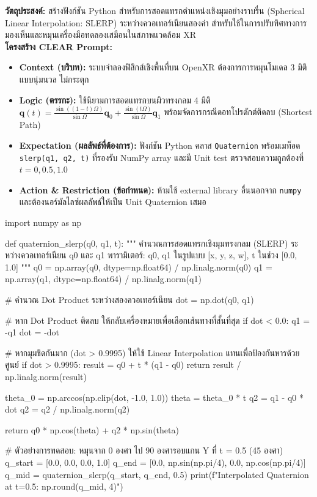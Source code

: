 \begin{aipromptbox}
\textbf{วัตถุประสงค์:} สร้างฟังก์ชัน Python สำหรับการสอดแทรกตำแหน่งเชิงมุมอย่างราบรื่น (Spherical Linear Interpolation: SLERP) ระหว่างควอเทอร์เนียนสองค่า สำหรับใช้ในการปรับทิศทางการมองเห็นและหมุนเครื่องมือทดลองเสมือนในสภาพแวดล้อม XR\\
\textbf{โครงสร้าง CLEAR Prompt:}
\begin{itemize}[topsep=1pt, itemsep=1pt, leftmargin=1.2em]
    \item \textbf{Context (บริบท):} ระบบจำลองฟิสิกส์เชิงพื้นที่บน OpenXR ต้องการการหมุนโมเดล 3 มิติแบบนุ่มนวล ไม่กระตุก
    \item \textbf{Logic (ตรรกะ):} ใช้นิยามการสอดแทรกบนผิวทรงกลม 4 มิติ $\mathbf{q}(t) = \frac{\sin((1-t)\Omega)}{\sin\Omega}\mathbf{q}_0 + \frac{\sin(t\Omega)}{\sin\Omega}\mathbf{q}_1$ พร้อมจัดการกรณีดอทโปรดักต์ติดลบ (Shortest Path)
    \item \textbf{Expectation (ผลลัพธ์ที่ต้องการ):} ฟังก์ชัน Python คลาส \texttt{Quaternion} พร้อมเมท็อด \texttt{slerp(q1, q2, t)} ที่รองรับ NumPy array และมี Unit test ตรวจสอบความถูกต้องที่ $t=0, 0.5, 1.0$
    \item \textbf{Action \& Restriction (ข้อกำหนด):} ห้ามใช้ external library อื่นนอกจาก \texttt{numpy} และต้องนอร์มัลไลซ์ผลลัพธ์ให้เป็น Unit Quaternion เสมอ
\end{itemize}
\end{aipromptbox}

\begin{codebox}
import numpy as np

def quaternion_slerp(q0, q1, t):
    """
    คำนวณการสอดแทรกเชิงมุมทรงกลม (SLERP) ระหว่างควอเทอร์เนียน q0 และ q1
    พารามิเตอร์: q0, q1 ในรูปแบบ [x, y, z, w], t ในช่วง [0.0, 1.0]
    """
    q0 = np.array(q0, dtype=np.float64) / np.linalg.norm(q0)
    q1 = np.array(q1, dtype=np.float64) / np.linalg.norm(q1)
    
    # คำนวณ Dot Product ระหว่างสองควอเทอร์เนียน
    dot = np.dot(q0, q1)
    
    # หาก Dot Product ติดลบ ให้กลับเครื่องหมายเพื่อเลือกเส้นทางที่สั้นที่สุด
    if dot < 0.0:
        q1 = -q1
        dot = -dot
        
    # หากมุมชิดกันมาก (dot > 0.9995) ให้ใช้ Linear Interpolation แทนเพื่อป้องกันหารด้วยศูนย์
    if dot > 0.9995:
        result = q0 + t * (q1 - q0)
        return result / np.linalg.norm(result)
        
    theta_0 = np.arccos(np.clip(dot, -1.0, 1.0))
    theta = theta_0 * t
    q2 = q1 - q0 * dot
    q2 = q2 / np.linalg.norm(q2)
    
    return q0 * np.cos(theta) + q2 * np.sin(theta)

# ตัวอย่างการทดสอบ: หมุนจาก 0 องศา ไป 90 องศารอบแกน Y ที่ t = 0.5 (45 องศา)
q_start = [0.0, 0.0, 0.0, 1.0]
q_end = [0.0, np.sin(np.pi/4), 0.0, np.cos(np.pi/4)]
q_mid = quaternion_slerp(q_start, q_end, 0.5)
print(f"Interpolated Quaternion at t=0.5: {np.round(q_mid, 4)}")
\end{codebox}

